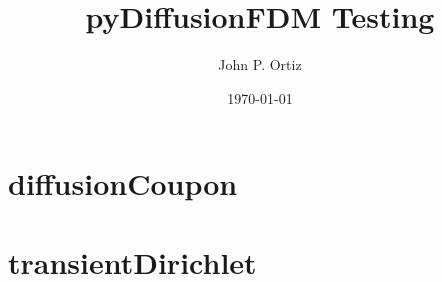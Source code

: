 \documentclass{article}
\title{pyDiffusionFDM Testing}
\author{John P. Ortiz}
\date{\today}
\begin{document}
\maketitle
\section{diffusionCoupon}

\section{transientDirichlet}

\end{document}
